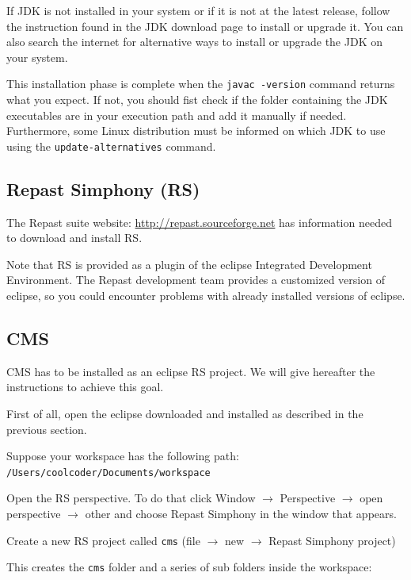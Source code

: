 \documentclass{article}
\begin{document}
If JDK is not installed in your system or if it is not at the latest release, follow the instruction found in the JDK download page to install or upgrade it. You can also search the internet for alternative ways to install or upgrade the JDK on your system.

This installation phase is complete when the \verb+javac -version+ command returns what you expect.
If not, you should fist check if the folder containing the JDK executables are in your execution path and add it manually if needed.
Furthermore, some Linux distribution must be informed on which JDK to use using the \verb+update-alternatives+ command. 

\subsection{Repast Simphony (RS)}

The Repast suite website: \url{http://repast.sourceforge.net} has information needed to download and install RS.

Note that RS is provided as a plugin of the eclipse Integrated Development Environment. The Repast development team provides a customized version of eclipse, so you could encounter problems with already installed versions of eclipse. 

\subsection{CMS}

CMS has to be installed as an eclipse RS project. We will give hereafter the instructions to achieve this goal.

First of all, open the eclipse downloaded and installed as described in the previous section.

Suppose your workspace has the following path:\\
\verb+/Users/coolcoder/Documents/workspace+

Open the RS perspective. To do that click Window $\rightarrow$ Perspective $\rightarrow$ open perspective $\rightarrow$ other and choose Repast Simphony in the window that appears.

Create a new RS project called \verb+cms+ (file $\rightarrow$ new $\rightarrow$ Repast Simphony project)

This creates the \verb+cms+ folder and a series of sub folders inside the workspace:
\end{document}
